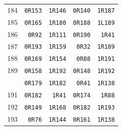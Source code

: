 \begin{longtable}{@{}r r r r r@{}}
184 & \texttt{0R153} & \texttt{1R146} & \texttt{0R140} & \texttt{1R187}\\
185 & \texttt{0R165} & \texttt{1R180} & \texttt{0R188} & \texttt{1L189}\\
186 & \texttt{0R92} & \texttt{1R111} & \texttt{0R190} & \texttt{1R41}\\
187 & \texttt{0R193} & \texttt{1R159} & \texttt{0R32} & \texttt{1R189}\\
188 & \texttt{0R169} & \texttt{1R154} & \texttt{0R88} & \texttt{1R191}\\
189 & \texttt{0R158} & \texttt{1R192} & \texttt{0R148} & \texttt{1R192}\\
\addlinespace[3pt]
190 & \texttt{0R179} & \texttt{1R182} & \texttt{0R41} & \texttt{1R138}\\
191 & \texttt{0R182} & \texttt{1R41} & \texttt{0R174} & \texttt{1R88}\\
192 & \texttt{0R149} & \texttt{1R168} & \texttt{0R182} & \texttt{1R193}\\
193 & \texttt{0R76} & \texttt{1R144} & \texttt{0R161} & \texttt{1R138}\\
\end{longtable}
\normalsize
